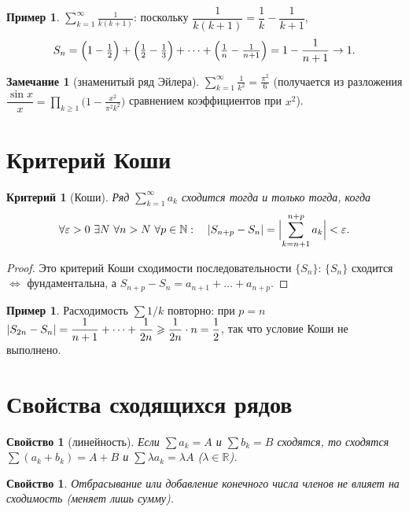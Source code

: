 \documentclass[11pt,a4paper]{article}
\theoremstyle{definition}
\newtheorem{example}[definition]{Пример}
\newtheorem{remark}[definition]{Замечание}
\theoremstyle{plain}
\newtheorem{property}[definition]{Свойство}
\newtheorem{criterion}[definition]{Критерий}
\newcommand{\R}{\mathbb{R}}
\newcommand{\N}{\mathbb{N}}
\newcommand{\eps}{\varepsilon}
\renewcommand{\ge}{\geqslant}
\DeclarePairedDelimiter{\abs}{\lvert}{\rvert}
\begin{document}
\begin{example}
$\displaystyle\sum_{k=1}^\infty\frac{1}{k(k+1)}$: поскольку $\dfrac{1}{k(k+1)}=\dfrac1k-\dfrac1{k+1}$,
\[
  S_n=\Bigl(1-\tfrac12\Bigr)+\Bigl(\tfrac12-\tfrac13\Bigr)+\dots+\Bigl(\tfrac1n-\tfrac1{n+1}\Bigr)
   =1-\frac1{n+1}\to1 .
\]
\end{example}

\begin{remark}[знаменитый ряд Эйлера]
$\displaystyle\sum_{k=1}^\infty\frac1{k^2}=\frac{\pi^2}{6}$ (получается из разложения
$\dfrac{\sin x}{x}=\prod_{k\ge1}\bigl(1-\tfrac{x^2}{\pi^2k^2}\bigr)$ сравнением коэффициентов при
$x^2$).
\end{remark}

\section{Критерий Коши}

\begin{criterion}[Коши]
Ряд $\displaystyle\sum_{k=1}^\infty a_k$ сходится тогда и только тогда, когда
\[
  \forall\eps>0\ \exists N\ \forall n>N\ \forall p\in\N:\quad
  \abs{S_{n+p}-S_n}=\abs[\Big]{\sum_{k=n+1}^{n+p}a_k}<\eps .
\]
\end{criterion}

\begin{proof}
Это критерий Коши сходимости последовательности $\{S_n\}$: $\{S_n\}$ сходится $\iff$ фундаментальна,
а $S_{n+p}-S_n=a_{n+1}+\dots+a_{n+p}$.
\end{proof}

\begin{example}
Расходимость $\sum1/k$ повторно: при $p=n$
$\displaystyle\abs{S_{2n}-S_n}=\frac1{n+1}+\dots+\frac1{2n}\ge\frac1{2n}\cdot n=\frac12$, так что
условие Коши не выполнено.
\end{example}

\section{Свойства сходящихся рядов}

\begin{property}[линейность]
Если $\sum a_k=A$ и $\sum b_k=B$ сходятся, то сходятся $\sum(a_k+b_k)=A+B$ и
$\sum\lambda a_k=\lambda A$ ($\lambda\in\R$).
\end{property}

\begin{property}
Отбрасывание или добавление конечного числа членов не влияет на сходимость (меняет лишь сумму).
\end{property}
\end{document}
